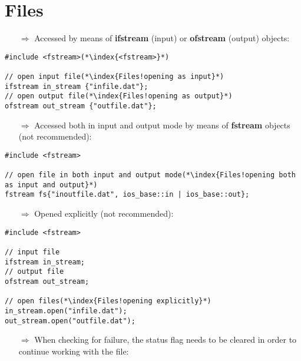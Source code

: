 \documentclass[10pt]{article}
\begin{document}
\section{Files}
\small
\begin{enumerate}
\item[$\Rightarrow$] Accessed by means of \textbf{ifstream} (input) or
\textbf{ofstream} (output) objects:
\end{enumerate}
\begin{lstlisting}
#include <fstream>(*\index{<fstream>}*)

// open input file(*\index{Files!opening as input}*)
ifstream in_stream {"infile.dat"};
// open output file(*\index{Files!opening as output}*)
ofstream out_stream {"outfile.dat"};
\end{lstlisting}
\begin{enumerate}
\item[$\Rightarrow$] Accessed both in input and output mode by means of \textbf{fstream} objects (not recommended):
\end{enumerate}
\begin{lstlisting}
#include <fstream>

// open file in both input and output mode(*\index{Files!opening both as input and output}*)
fstream fs{"inoutfile.dat", ios_base::in | ios_base::out};
\end{lstlisting}
\begin{enumerate}
\item[$\Rightarrow$] Opened explicitly (not recommended):
\end{enumerate}
\begin{lstlisting}
#include <fstream>

// input file 
ifstream in_stream;
// output file
ofstream out_stream;

// open files(*\index{Files!opening explicitly}*)
in_stream.open("infile.dat");
out_stream.open("outfile.dat");
\end{lstlisting}
\begin{enumerate}
\item[$\Rightarrow$] When checking for failure, the status flag needs to be cleared
in order to continue working with the file:
\end{enumerate}
\end{document}
